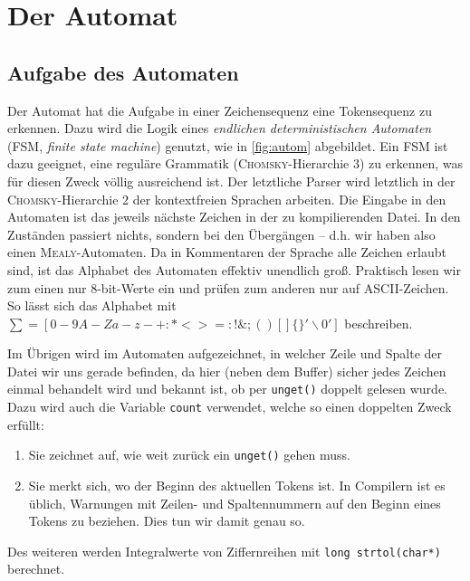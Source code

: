 \documentclass[
a4paper,   %
11pt,      %
oneside,   %
onecolumn, %
final      %
]{article}
\newcommand{\code}[1]{\lstinline$#1$}
\begin{document}
\section{Der Automat} \label{sec:autom}

\subsection{Aufgabe des Automaten}
Der Automat hat die Aufgabe in einer Zeichensequenz eine Tokensequenz zu erkennen.
Dazu wird die Logik eines \emph{endlichen deterministischen Automaten} (FSM, \emph{finite state machine}) genutzt, wie in \ref{fig:autom} abgebildet.
Ein FSM ist dazu geeignet, eine reguläre Grammatik (\textsc{Chomsky}-Hierarchie 3) zu erkennen, was für diesen Zweck völlig ausreichend ist. Der letztliche Parser wird letztlich in der \textsc{Chomsky}-Hierarchie 2 der kontextfreien Sprachen arbeiten.
Die Eingabe in den Automaten ist das jeweils nächste Zeichen in der zu kompilierenden Datei.
In den Zuständen passiert nichts, sondern bei den Übergängen -- d.h. wir haben also einen \textsc{Mealy}-Automaten.
Da in Kommentaren der Sprache alle Zeichen erlaubt sind, ist das Alphabet des Automaten effektiv unendlich groß.
Praktisch lesen wir zum einen nur 8-bit-Werte ein und prüfen zum anderen nur auf ASCII-Zeichen.
So lässt sich das Alphabet mit $\sum = [0-9A-Za-z-+:*<>=:!\&;()[]\{\}'\backslash0']$ beschreiben.

Im Übrigen wird im Automaten aufgezeichnet, in welcher Zeile und Spalte der Datei wir uns gerade befinden, da hier (neben dem Buffer) sicher jedes Zeichen einmal behandelt wird und bekannt ist, ob per \code{unget()} doppelt gelesen wurde. Dazu wird auch die Variable \code{count} verwendet, welche so einen doppelten Zweck erfüllt:
\begin{enumerate}
\item Sie zeichnet auf, wie weit zurück ein \code{unget()} gehen muss.
\item Sie merkt sich, wo der Beginn des aktuellen Tokens ist. In Compilern ist es üblich, Warnungen mit Zeilen- und Spaltennummern auf den Beginn eines Tokens zu beziehen. Dies tun wir damit genau so.
\end{enumerate}

Des weiteren werden Integralwerte von Ziffernreihen mit \code{long strtol(char*)} berechnet.
\end{document}
